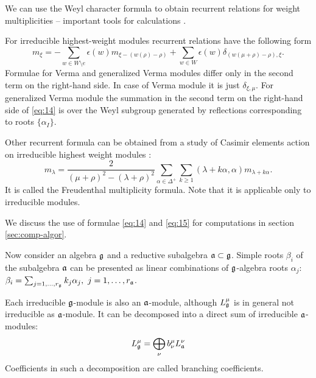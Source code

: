 
We can use the Weyl character formula to obtain recurrent relations for weight multiplicities -- important tools for calculations \cite{il2010folded,kulish4sfa}. 

For irreducible highest-weight modules recurrent relations have the following form
\begin{equation}
\label{eq:14}
m_{\xi }=-\sum_{w\in W\setminus e}\epsilon (w)m_{\xi
-\left( w(\rho )-\rho \right) }+\sum_{w\in W}\epsilon
(w)\delta _{\left( w(\mu +\rho )-\rho \right) ,\xi }.
\end{equation}
Formulae for Verma and generalized Verma modules differ only in the second term on the right-hand side. In case of Verma module it is just $\delta_{\xi,\mu}$. For generalized Verma module the summation in the second term on the right-hand side of \eqref{eq:14} is over the Weyl subgroup generated by reflections corresponding to roots $\{\alpha_{I}\}$.

Other recurrent formula can be obtained from a study of Casimir
elements action on irreducible highest weight modules
\cite{humphreys1997introduction}:
\begin{equation}
  \label{eq:15}
  m_{\lambda}=\frac{2}{(\mu+\rho)^{2}-(\lambda+\rho)^{2}}\sum_{\alpha\in \Delta^{+}}\sum_{k\geq 1} (\lambda+k\alpha,\alpha)m_{\lambda+k\alpha}.
\end{equation}
It is called the Freudenthal multiplicity formula.
Note that it is applicable only to irreducible modules. 


We discuss the use of formulae \eqref{eq:14} and \eqref{eq:15} for computations in section \ref{sec:comp-algor}. 

Now consider an algebra $\mathfrak{g}$ and a reductive subalgebra
$\mathfrak{a}\subset \mathfrak{g}$. Simple roots $\beta_{i}$ of the subalgebra $\mathfrak{a}$
can be presented as linear combinations of $\mathfrak{g}$-algebra roots
$\alpha_{j}$: $\beta_{i}=\sum_{j=1,\dots,r_{\mathfrak{g}}}k_{j}
\alpha_{j},\ j=1,\dots,r_{\mathfrak{a}}$.

Each irreducible $\mathfrak{g}$-module is also an $\mathfrak{a}$-module, although
$L^{\mu}_{\mathfrak{g}}$ is in general not irreducible as $\mathfrak{a}$-module. 
It can be
decomposed into a direct sum of irreducible $\mathfrak{a}$-modules:
\begin{equation}
  \label{eq:16}
  L^{\mu}_{\mathfrak{g}}=\bigoplus_{\nu}b^{\mu}_{\nu}L^{\nu}_{\mathfrak{a}}
\end{equation}
Coefficients in such a decomposition are called branching
coefficients. 

